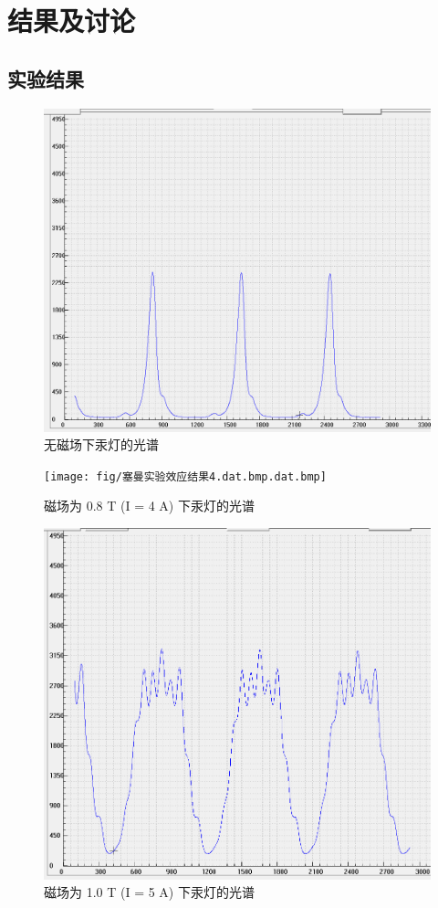 \documentclass[font=default]{mpltx}
\begin{document}
\section{结果及讨论}

\subsection{实验结果}

\begin{figure}[htbp]
  \centering
  \includegraphics[width=0.85\linewidth]{fig/塞曼实验效应结果0.dat.bmp}
  \caption{无磁场下汞灯的光谱}
  \label{fig:000}
\end{figure}

\begin{figure}[htbp]
  \centering
  \texttt{[image: fig/塞曼实验效应结果4.dat.bmp.dat.bmp]}
  \caption{磁场为 0.8 T (I = 4 A) 下汞灯的光谱}
  \label{fig:444}
\end{figure}

\begin{figure}[htbp]
  \centering
  \includegraphics[width=0.85\linewidth]{fig/塞曼实验效应结果51.dat.bmp}
  \caption{磁场为 1.0 T (I = 5 A) 下汞灯的光谱}
  \label{fig:555}
\end{figure}
\end{document}
